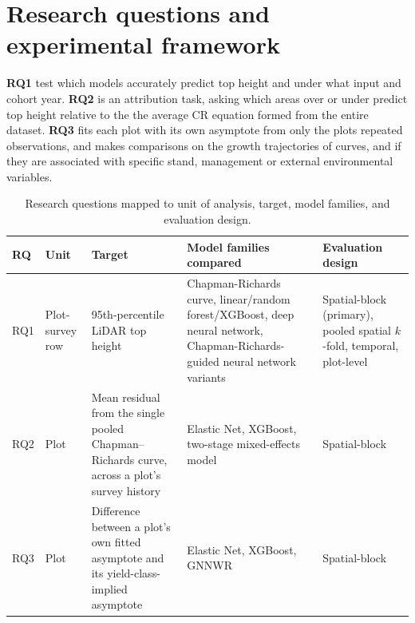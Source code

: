 \section{Research questions and experimental framework}
\textbf{RQ1} test which models accurately predict top height and under what input and cohort year. \textbf{RQ2} is an attribution task, asking which areas over or under predict top height relative to the the average CR equation formed from the entire dataset. \textbf{RQ3} fits each plot with its own asymptote from only the plots repeated observations, and makes comparisons on the growth trajectories of curves, and if they are associated with specific stand, management or external environmental variables.

\begin{table}[!htbp]
\scriptsize
\renewcommand{\arraystretch}{1.2}
\begin{tabular}{p{0.8cm}p{1.4cm}p{3.3cm}p{4.2cm}p{2.9cm}}
\toprule
RQ & Unit & Target & Model families compared & Evaluation design \\
\midrule
RQ1 & Plot-survey row & 95th-percentile LiDAR top height & Chapman-Richards curve,
linear/random forest/XGBoost, deep neural network, Chapman-Richards-guided neural network
variants & Spatial-block (primary), pooled spatial $k$-fold, temporal, plot-level \\
RQ2 & Plot & Mean residual from the single pooled Chapman--Richards curve, across a plot's survey
history & Elastic Net, XGBoost, two-stage mixed-effects model & Spatial-block \\
RQ3 & Plot & Difference between a plot's own fitted asymptote and its yield-class-implied
asymptote & Elastic Net, XGBoost, GNNWR & Spatial-block \\
\bottomrule
\end{tabular}
\caption{Research questions mapped to unit of analysis, target, model families, and evaluation
design.}
\label{tab:rq-framework}
\end{table}

